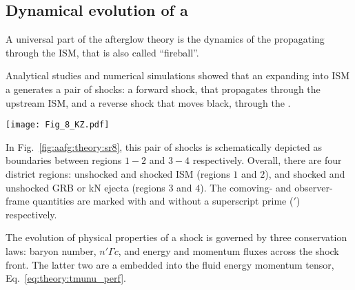 \subsection{Dynamical evolution of a \blast{}}

A universal part of the afterglow theory is the dynamics of the \trans{} 
\blast{} propagating through the \ac{ISM}, that is also called ``fireball''.

Analytical studies and numerical simulations showed that an 
expanding into \ac{ISM} a \blast{} generates a pair of shocks: a forward shock, that 
propagates through the upstream \ac{ISM}, and a reverse shock that moves black, 
through the \blast{} \citep[\eg][]{Blandford:1976}. 
\begin{figure*}[t]
    \centering 
    \texttt{[image: Fig\_8\_KZ.pdf]}
    \caption{
        This is a schematic sketch of a pair of shocks produced when a relativistic
        jet from a \ac{GRB} collides with the \ac{CBM}, as viewed from the
        rest frame of unshocked \ac{CBM}. Regions 2 \& 3 represent shocked \ac{CBM} and \ac{GRB}
        jet respectively. They move together with the same \ac{LF} ($\gamma_2$, as viewed
        by a stationary observer in the unshocked \ac{CBM}), and have the same pressure but
        different densities.
        (Adapted from \citet{Kumar:2014upa}, Fig.~8)
    }
    \label{fig:aafg:theory:sr8}
\end{figure*}
In Fig.~\ref{fig:aafg:theory:sr8}, this pair of shocks is schematically depicted as 
boundaries between regions $1-2$ and $3-4$ respectively. 
Overall, there are four district regions: unshocked and shocked \ac{ISM} (regions $1$ and $2$), 
and shocked and unshocked \ac{GRB} or \ac{kN} ejecta (regions $3$ and $4$).
The comoving- and observer-frame quantities are marked with and without a superscript prime ($'$) 
respectively. 

The evolution of physical properties of a shock is governed by three conservation laws: 
baryon number, $n' \Gamma c$, and energy and momentum fluxes across the shock front. 
The latter two are a embedded into the fluid energy momentum tensor, Eq.~\eqref{eq:theory:tmunu_perf}. 

